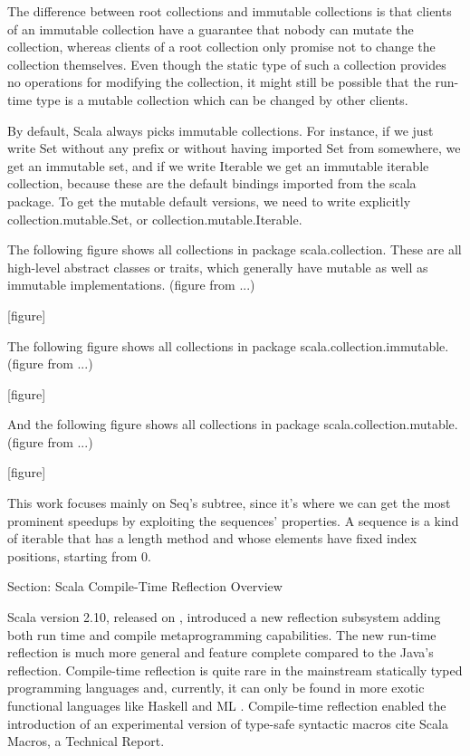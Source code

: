 The difference between root collections and immutable collections is that
clients of an immutable collection have a guarantee that nobody can mutate the
collection, whereas clients of a root collection only promise not to change the
collection themselves. Even though the static type of such a collection provides
no operations for modifying the collection, it might still be possible that the
run-time type is a mutable collection which can be changed by other clients.

By default, Scala always picks immutable collections. For instance, if we just
write Set without any prefix or without having imported Set from somewhere, we
get an immutable set, and if we write Iterable we get an immutable iterable
collection, because these are the default bindings imported from the scala
package. To get the mutable default versions, we need to write explicitly
collection.mutable.Set, or collection.mutable.Iterable.

The following figure shows all collections in package scala.collection. These
are all high-level abstract classes or traits, which generally have mutable as
well as immutable implementations. (figure from ...)

[figure]

The following figure shows all collections in package
scala.collection.immutable. (figure from ...)

[figure]

And the following figure shows all collections in package
scala.collection.mutable. (figure from ...)

[figure]

This work focuses mainly on Seq's subtree, since it's where we can get the
most prominent speedups by exploiting the sequences' properties. A sequence is a
kind of iterable that has a length method and whose elements have fixed index
positions, starting from 0.


Section: Scala Compile-Time Reflection Overview

Scala version 2.10, released on , introduced a new reflection
subsystem adding both run time and compile metaprogramming capabilities. The new
run-time reflection is much more general and feature complete compared to the
Java's reflection. Compile-time reflection is quite rare in the mainstream
statically typed programming languages and, currently, it can only be found in
more exotic functional languages like Haskell 
and ML . Compile-time reflection enabled the introduction
of an experimental version of type-safe syntactic macros {cite Scala Macros, a
Technical Report}. 

